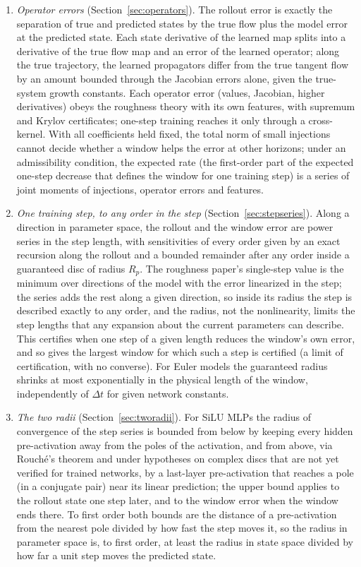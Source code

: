 \documentclass[11pt]{article}
\theoremstyle{definition}
\theoremstyle{remark}
\newcommand{\dt}{\Delta t}
\begin{document}
\begin{enumerate}
\item \emph{Operator errors} (Section~\ref{sec:operators}). The rollout error is exactly the separation of true and predicted states by the true flow plus the model error at the predicted state. Each state derivative of the learned map splits into a derivative of the true flow map and an error of the learned operator; along the true trajectory, the learned propagators differ from the true tangent flow by an amount bounded through the Jacobian errors alone, given the true-system growth constants. Each operator error (values, Jacobian, higher derivatives) obeys the roughness theory with its own features, with supremum and Krylov certificates; one-step training reaches it only through a cross-kernel. With all coefficients held fixed, the total norm of small injections cannot decide whether a window helps the error at other horizons; under an admissibility condition, the expected rate (the first-order part of the expected one-step decrease that defines the window for one training step) is a series of joint moments of injections, operator errors and features.
\item \emph{One training step, to any order in the step} (Section~\ref{sec:stepseries}). Along a direction in parameter space, the rollout and the window error are power series in the step length, with sensitivities of every order given by an exact recursion along the rollout and a bounded remainder after any order inside a guaranteed disc of radius $R_p$. The roughness paper's single-step value is the minimum over directions of the model with the error linearized in the step; the series adds the rest along a given direction, so inside its radius the step is described exactly to any order, and the radius, not the nonlinearity, limits the step lengths that any expansion about the current parameters can describe. This certifies when one step of a given length reduces the window's own error, and so gives the largest window for which such a step is certified (a limit of certification, with no converse). For Euler models the guaranteed radius shrinks at most exponentially in the physical length of the window, independently of $\dt$ for given network constants.
\item \emph{The two radii} (Section~\ref{sec:tworadii}). For SiLU MLPs the radius of convergence of the step series is bounded from below by keeping every hidden pre-activation away from the poles of the activation, and from above, via Rouché's theorem and under hypotheses on complex discs that are not yet verified for trained networks, by a last-layer pre-activation that reaches a pole (in a conjugate pair) near its linear prediction; the upper bound applies to the rollout state one step later, and to the window error when the window ends there. To first order both bounds are the distance of a pre-activation from the nearest pole divided by how fast the step moves it, so the radius in parameter space is, to first order, at least the radius in state space divided by how far a unit step moves the predicted state.
\end{enumerate}
\end{document}
